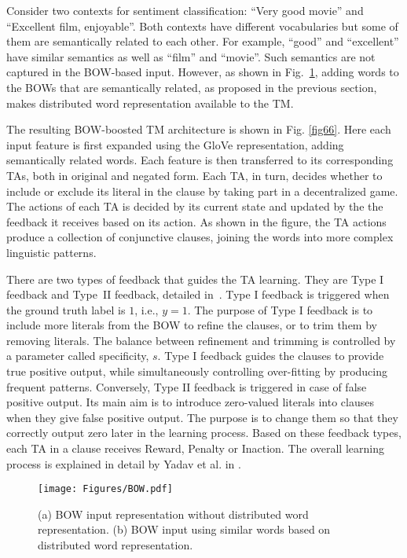 \documentclass[11pt]{article}
\begin{document}
Consider two contexts for sentiment classification: ``Very good movie'' and ``Excellent film, enjoyable''. Both contexts have different vocabularies but some of them are semantically related to each other. For example, ``good'' and ``excellent'' have similar semantics as well as ``film'' and ``movie''. Such semantics are not captured in the BOW-based input. However, as shown in Fig.~\ref{fig5}, adding words to the BOWs that are semantically related, as proposed in the previous section, makes distributed word representation available to the TM. 
\par    
 The resulting BOW-boosted TM architecture is shown in Fig. \ref{fig66}. Here each input feature is first expanded using the GloVe representation, adding semantically related words. Each feature is then transferred to its corresponding TAs, both in original and negated form. Each TA, in turn, decides whether to include or exclude its literal in the clause by taking part in a decentralized game. The actions of each TA is decided by its current state and updated by the the feedback it receives based on its action. As shown in the figure, the TA actions produce a collection of conjunctive clauses, joining the words into more complex linguistic patterns.
 
 There are two types of feedback that guides the TA learning. They are Type I feedback and Type~II feedback, detailed in~\cite{Granmo2018TheTM}. Type I feedback is triggered when the ground truth label is \(1\), i.e., \(y = 1\). The purpose of Type I feedback is to include more literals from the BOW to refine the clauses, or to trim them by removing literals. The balance between refinement and trimming is controlled by a parameter called specificity, \(s\). Type I feedback guides the clauses to provide true positive output, while simultaneously controlling over-fitting by producing frequent patterns. Conversely, Type II feedback is triggered in case of false positive output. Its main aim is to introduce zero-valued literals into clauses when they give false positive output. The purpose is to change them so that they correctly output zero later in the learning process. Based on these feedback types, each TA in a clause receives Reward, Penalty or Inaction. The overall learning process is explained in detail by Yadav et al. in \cite{yadav2021sentiment}.

\begin{figure}[h]
    \centering
    \texttt{[image: Figures/BOW.pdf]}
    \caption{(a) BOW input representation without distributed word representation. (b) BOW input using similar words based on distributed word representation.}
    \label{fig5}
\end{figure}
\end{document}
